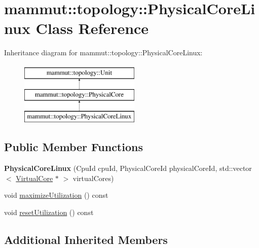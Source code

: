 \hypertarget{classmammut_1_1topology_1_1PhysicalCoreLinux}{\section{mammut\-:\-:topology\-:\-:Physical\-Core\-Linux Class Reference}
\label{classmammut_1_1topology_1_1PhysicalCoreLinux}
}
Inheritance diagram for mammut\-:\-:topology\-:\-:Physical\-Core\-Linux\-:\begin{figure}[H]
\begin{center}
\leavevmode
\includegraphics[height=3.000000cm]{classmammut_1_1topology_1_1PhysicalCoreLinux}
\end{center}
\end{figure}
\subsection*{Public Member Functions}
\begin{DoxyCompactItemize}
\item 
\hypertarget{classmammut_1_1topology_1_1PhysicalCoreLinux_a117187d74d105e7fb8cde0b58eed668b}{{\bfseries Physical\-Core\-Linux} (Cpu\-Id cpu\-Id, Physical\-Core\-Id physical\-Core\-Id, std\-::vector$<$ \hyperlink{classmammut_1_1topology_1_1VirtualCore}{Virtual\-Core} $\ast$ $>$ virtual\-Cores)}\label{classmammut_1_1topology_1_1PhysicalCoreLinux_a117187d74d105e7fb8cde0b58eed668b}

\item 
void \hyperlink{classmammut_1_1topology_1_1PhysicalCoreLinux_a1f0d1fd02c9ac9a5960a880849affa45}{maximize\-Utilization} () const 
\item 
void \hyperlink{classmammut_1_1topology_1_1PhysicalCoreLinux_a6c65161ad3041a8cedb8a9bc43757c02}{reset\-Utilization} () const 
\end{DoxyCompactItemize}
\subsection*{Additional Inherited Members}


